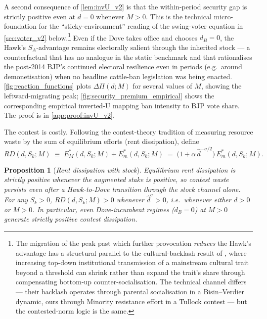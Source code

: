 \documentclass[11pt,twoside]{extarticle}
\newtheorem{proposition}{Proposition}
\begin{document}
A second consequence of \autoref{lem:invU_v2} is that the within-period security gap is strictly positive even at $d=0$ whenever $M>0$. This is the technical micro-foundation for the ``sticky-environment'' reading of the swing-voter equation in \autoref{sec:voter_v2} below.\footnote{The migration of the peak past which further provocation \emph{reduces} the Hawk's advantage has a structural parallel to the cultural-backlash result of \citet{carvalhoKoyamaWilliamsResistingEducation2024}, where increasing top-down institutional transmission of a mainstream cultural trait beyond a threshold can shrink rather than expand the trait's share through compensating bottom-up counter-socialisation. The technical channel differs --- their backlash operates through parental socialisation in a Bisin--Verdier dynamic, ours through Minority resistance effort in a Tullock contest --- but the contested-norm logic is the same.} Even if the Dove takes office and chooses $d_B=0$, the Hawk's $S_A$-advantage remains electorally salient through the inherited stock — a counterfactual that has no analogue in the static benchmark and that rationalises the post-2014 BJP's continued electoral resilience even in periods (e.g.\ around demonetisation) when no headline cattle-ban legislation was being enacted. \autoref{fig:reaction_functions} plots $\Delta\Pi(d;M)$ for several values of $M$, showing the leftward-migrating peak; \autoref{fig:security_premium_empirical} shows the corresponding empirical inverted-U mapping ban intensity to BJP vote share. The proof is in \autoref{app:proof:invU_v2}.

The contest is costly. Following the contest-theory tradition of measuring resource waste by the sum of equilibrium efforts (rent dissipation), define
\begin{equation}\label{eq:RD_closed_form}
    RD(d,S_k;M)\;\equiv\;E_M^*(d,S_k;M)+E_m^*(d,S_k;M)\;=\;\big(1+\alpha\,\hat d^{-\sigma/2}\big)\,E_m^*(d,S_k;M).
\end{equation}

\begin{proposition}[\emph{Rent dissipation with stock}]\label{prop:RD_v2}
\emph{Equilibrium rent dissipation is strictly positive whenever the augmented stake is positive, so contest waste persists even after a Hawk-to-Dove transition through the stock channel alone.}
For any $S_k>0$, $RD(d,S_k;M)>0$ whenever $\hat d^\sigma>0$, i.e.\ whenever either $d>0$ or $M>0$. In particular, even Dove-incumbent regimes ($d_B=0$) at $M>0$ generate strictly positive contest dissipation.
\end{proposition}
\end{document}
